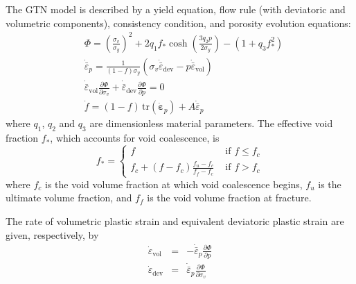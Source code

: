 \documentclass[sn-mathphys,Numbered]{sn-jnl}%
\begin{document}
The GTN model is described by a yield equation, flow rule (with deviatoric and volumetric components), consistency condition, and porosity evolution equations:
\begin{eqnarray}
	&\Phi =
	\left(\frac{\sigma_v}{\sigma_y}\right)^2 + 2 q_1 f_* \cosh \left(\frac{3 q_2 p}{2 \sigma_y}\right)
	- \left(1 + q_3 f^{2}_* \right) \label{eqn:GTN1} \\
	&\dot{\bar{\varepsilon}}_p =
		\frac{1}{(1-f) \sigma_y} (\sigma_v \dot{ \bar{\varepsilon}}_\text{dev} - p \dot{ \bar{\varepsilon}}_\text{vol}) \label{eqn:GTN2} \\
	&\dot{\bar{\varepsilon}}_\text{vol} \frac{\partial \Phi}{\partial \sigma_v}
		+ \dot{\bar{\varepsilon}}_\text{dev} \frac{\partial \Phi}{\partial p} = 0 \label{eqn:GTN3} \\
	&\dot{f} = (1-f) \, \text{tr}\left(\dot{\boldsymbol{\varepsilon}}_p\right)+A \dot{\bar{\varepsilon}}_p \label{eqn:GTN4}
\end{eqnarray}
where $q_1$, $q_2$ and $q_3$ are dimensionless material parameters.
The effective void fraction $f_*$, which accounts for void coalescence, is
\begin{equation} \label{eqn:GTNCoalescence}
	f_*=
	\left\{
	\begin{array}{cc}
		f & \text { if } f \leq f_c \\
		f_c+\left(f-f_c\right) \frac{f_u-f_c}{f_f-f_c} & \text { if } f>f_c
	\end{array}\right.
\end{equation}
where $f_c$ is the void volume fraction at which void coalescence begins, $f_u$ is the ultimate volume fraction, and $f_f$ is the void volume fraction at fracture.

The rate of volumetric plastic strain and equivalent deviatoric plastic strain are given, respectively, by
\begin{eqnarray}
	\dot{ \varepsilon}_\text{vol} &=& -\dot{\bar{\varepsilon}}_p \frac{\partial \Phi}{\partial p} \\
	\dot{ \varepsilon}_\text{dev} &=& \dot{\bar{\varepsilon}}_p \frac{\partial \Phi}{\partial \sigma_v}
\end{eqnarray}
\end{document}
